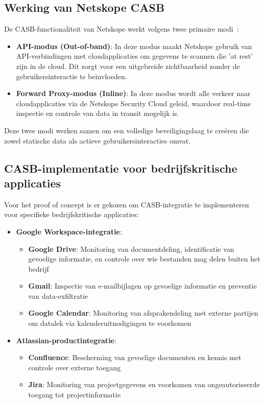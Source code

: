 \subsection{Werking van Netskope CASB}
 
De CASB-functionaliteit van Netskope werkt volgens twee primaire modi~\autocite{Netskope2025-4}:

\begin{itemize}
    \item \textbf{API-modus (Out-of-band)}: In deze modus maakt Netskope gebruik van API-verbindingen met cloudapplicaties om gegevens te scannen die 'at rest' zijn in de cloud. Dit zorgt voor een uitgebreide zichtbaarheid zonder de gebruikersinteractie te beïnvloeden.

    \item \textbf{Forward Proxy-modus (Inline)}: In deze modus wordt alle verkeer naar cloudapplicaties via de Netskope Security Cloud geleid, waardoor real-time inspectie en controle van data in transit mogelijk is.
\end{itemize}

Deze twee modi werken samen om een volledige beveiligingslaag te creëren die zowel statische data als actieve gebruikersinteracties omvat.

\subsection{CASB-implementatie voor bedrijfskritische applicaties}

Voor het proof of concept is er gekozen om CASB-integratie te implementeren voor specifieke bedrijfskritische applicaties:

\begin{itemize}
    \item \textbf{Google Workspace-integratie}:
        \begin{itemize}
            \item \textbf{Google Drive}: Monitoring van documentdeling, identificatie van gevoelige informatie, en controle over wie bestanden mag delen buiten het bedrijf
            \item \textbf{Gmail}: Inspectie van e-mailbijlagen op gevoelige informatie en preventie van data-exfiltratie
            \item \textbf{Google Calendar}: Monitoring van afsprakendeling met externe partijen om datalek via kalenderuitnodigingen te voorkomen
        \end{itemize}
    \item \textbf{Atlassian-productintegratie}:
        \begin{itemize}
            \item \textbf{Confluence}: Bescherming van gevoelige documenten en kennis met controle over externe toegang
            \item \textbf{Jira}: Monitoring van projectgegevens en voorkomen van ongeautoriseerde toegang tot projectinformatie
        \end{itemize}
\end{itemize}

